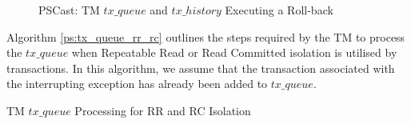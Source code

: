     \begin{figure}[h] 
        \centering
         \caption[PSCast: TM $tx\_queue$ and $tx\_history$ Executing a Roll-back]{PSCast: TM $tx\_queue$ and $tx\_history$ Executing a Roll-back}
         \label{fig:tx_queue_history_rollback}
    \end{figure}  
    
    Algorithm \ref{ps:tx_queue_rr_rc} outlines the steps required by the TM to process the $tx\_queue$ when Repeatable Read or Read Committed isolation is utilised by transactions.  In this algorithm, we assume that the transaction associated with the interrupting exception has already been added to $tx\_queue$.  
    
    \begin{algorithm}[h]
        \caption{TM $tx\_queue$ Processing for RR and RC Isolation}
        \label{ps:tx_queue_rr_rc}
        \begin{algorithmic}[1]
                
                \ENDWHILE
                             
                \ENDIF
                
                \ENDIF
                
            \ENDWHILE
        \end{algorithmic}%
    \end{algorithm}
    
